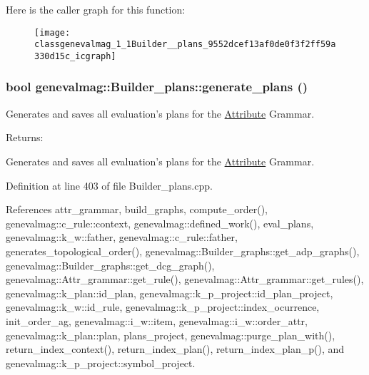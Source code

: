 Here is the caller graph for this function:\nopagebreak
\begin{figure}[H]
\begin{center}
\leavevmode
\texttt{[image: classgenevalmag\_1\_1Builder\_\_plans\_9552dcef13af0de0f3f2ff59a330d15c\_icgraph]}
\end{center}
\end{figure}
\hypertarget{classgenevalmag_1_1Builder__plans_5002819447c17a1f81c197da66bd3e56}{
\subsubsection[{generate\_\-plans}]{\setlength{\rightskip}{0pt plus 5cm}bool genevalmag::Builder\_\-plans::generate\_\-plans ()}}
\label{classgenevalmag_1_1Builder__plans_5002819447c17a1f81c197da66bd3e56}


Generates and saves all evaluation's plans for the \hyperlink{classgenevalmag_1_1Attribute}{Attribute} Grammar. \begin{Desc}
\item[Returns:]\end{Desc}
Generates and saves all evaluation's plans for the \hyperlink{classgenevalmag_1_1Attribute}{Attribute} Grammar. 

Definition at line 403 of file Builder\_\-plans.cpp.

References attr\_\-grammar, build\_\-graphs, compute\_\-order(), genevalmag::c\_\-rule::context, genevalmag::defined\_\-work(), eval\_\-plans, genevalmag::k\_\-w::father, genevalmag::c\_\-rule::father, generates\_\-topological\_\-order(), genevalmag::Builder\_\-graphs::get\_\-adp\_\-graphs(), genevalmag::Builder\_\-graphs::get\_\-dcg\_\-graph(), genevalmag::Attr\_\-grammar::get\_\-rule(), genevalmag::Attr\_\-grammar::get\_\-rules(), genevalmag::k\_\-plan::id\_\-plan, genevalmag::k\_\-p\_\-project::id\_\-plan\_\-project, genevalmag::k\_\-w::id\_\-rule, genevalmag::k\_\-p\_\-project::index\_\-ocurrence, init\_\-order\_\-ag, genevalmag::i\_\-w::item, genevalmag::i\_\-w::order\_\-attr, genevalmag::k\_\-plan::plan, plans\_\-project, genevalmag::purge\_\-plan\_\-with(), return\_\-index\_\-context(), return\_\-index\_\-plan(), return\_\-index\_\-plan\_\-p(), and genevalmag::k\_\-p\_\-project::symbol\_\-project.

